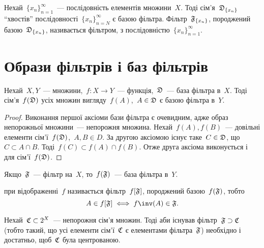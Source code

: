 \begin{definition}
    Нехай~$\{x_n\}_{n = 1}^\infty$~--- послідовність елементів множини~$X$. Тоді сім'я~$\frak D_{\{x_n\}}$ ``хвостів'' послідовності~$\{x_n\}_{n = N}^\infty$ є базою фільтра. Фільтр~$\frak F_{\{x_n\}}$, породжений базою~$\frak D_{\{x_n\}}$, називається фільтром,  з послідовністю~$\{x_n\}_{n = 1}^\infty$.
\end{definition}

\section{Образи фільтрів і баз фільтрів}

\begin{theorem}
    \label{th:filterbase-image-filterbase}
    Нехай~$X, Y$~--- множини,~$f: X \to Y$~--- функція,~$\frak D$~--- база фільтра в~$X$. Тоді сім'я~$f(\frak D)$ усіх множин вигляду~$f(A)$,~$A \in \frak D$ є базою фільтра в~$Y$.
\end{theorem}

\begin{proof}
    Виконання першої аксіоми бази фільтра є очевидним, адже образ непорожньої множини~--- непорожня множина. Нехай~$f(A), f(B)$~--- довільні елементи сім'ї~$f(\frak D)$,~$A, B \in D$. За другою аксіомою існує таке~$C \in \frak D$, що~$C \subset A \cap B$. Тоді~$f(C) \subset f(A) \cap f(B)$. Отже друга аксіома виконується і для сім'ї~$f(\frak D)$.
\end{proof}

\begin{corollary}
    \label{th:filter-image-filterbase}
    Якщо~$\frak F$~--- фільтр на~$X$, то~$f(\frak F)$~--- база фільтра в~$Y$.
\end{corollary}

\begin{definition}
     при відображенні~$f$ називається фільтр~$f[\frak F]$, породжений базою~$f(\frak F)$, тобто
    \begin{equation*}
        A \in f[\frak F] \iff f\inv (A) \in \frak F.
    \end{equation*}
\end{definition}

\begin{theorem}
    \label{th:supset-finite-intersection-property}
    Нехай~$\frak C \subset 2^X$~--- непорожня сім'я множин. Тоді аби існував фільтр~$\frak F \supset \frak C$ (тобто такий, що усі елементи сім'ї~$\frak C$ є елементами фільтра~$\frak F$) необхідно і достатньо, щоб~$\frak C$ була центрованою.
\end{theorem}

